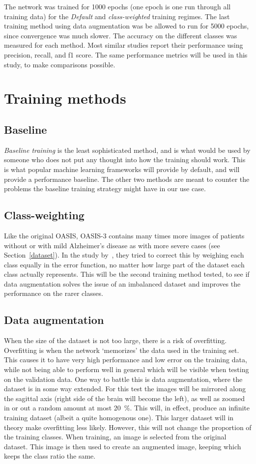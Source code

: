 \documentclass{kththesis}
\newcommand{\num}[1]{{#1}}
\begin{document}
The network was trained for \num{1000} epochs (one epoch is one run through all training data) for the \textit{Default} and \textit{class-weighted} training regimes. The last training method using data augmentation was be allowed to run for \num{5000} epochs, since convergence was much slower. The accuracy on the different classes was measured for each method. Most similar studies report their performance using precision, recall, and f1 score. The same performance metrics will be used in this study, to make comparisons possible.

\section{Training methods}
\subsection{Baseline}
\textit{Baseline training} is the least sophisticated method, and is what would be used by someone who does not put any thought into how the training should work. This is what popular machine learning frameworks will provide by default, and will provide a performance baseline. The other two methods are meant to counter the problems the baseline training strategy might have in our use case.

\subsection{Class-weighting}
Like the original OASIS, OASIS-3 contains many times more images of patients without or with mild Alzheimer's disease as with more severe cases (see Section~\ref{dataset}). In the study by~\textcite{islam2017novel}, they tried to correct this by weighing each class equally in the error function, no matter how large part of the dataset each class actually represents. This will be the second training method tested, to see if data augmentation solves the issue of an imbalanced dataset and improves the performance on the rarer classes.

\subsection{Data augmentation}
When the size of the dataset is not too large, there is a risk of overfitting. Overfitting is when the network `memorizes' the data used in the training set. This causes it to have very high performance and low error on the training data, while not being able to perform well in general which will be visible when testing on the validation data. One way to battle this is data augmentation, where the dataset is in some way extended. For this test the images will be mirrored along the sagittal axis (right side of the brain will become the left), as well as zoomed in or out a random amount at most 20~\%. This will, in effect, produce an infinite training dataset (albeit a quite homogenous one). This larger dataset will in theory make overfitting less likely. However, this will not change the proportion of the training classes. When training, an image is selected from the original dataset. This image is then used to create an augmented image, keeping which keeps the class ratio the same.
\end{document}
